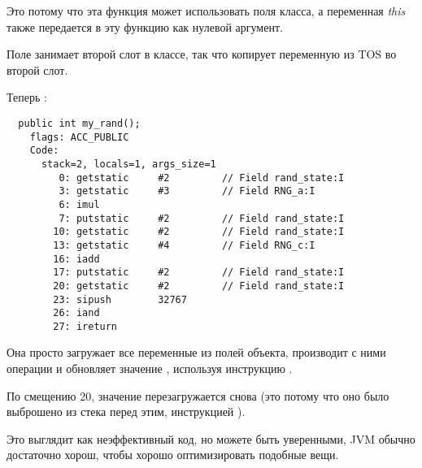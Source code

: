 Это потому что эта функция может использовать поля класса, а переменная \emph{this} 
также передается в эту функцию как нулевой аргумент.

Поле  занимает второй слот в классе,
так что  копирует переменную из \ac{TOS} во второй слот.

Теперь :

\begin{lstlisting}
  public int my_rand();
    flags: ACC_PUBLIC
    Code:
      stack=2, locals=1, args_size=1
         0: getstatic     #2         // Field rand_state:I
         3: getstatic     #3         // Field RNG_a:I
         6: imul          
         7: putstatic     #2         // Field rand_state:I
        10: getstatic     #2         // Field rand_state:I
        13: getstatic     #4         // Field RNG_c:I
        16: iadd          
        17: putstatic     #2         // Field rand_state:I
        20: getstatic     #2         // Field rand_state:I
        23: sipush        32767
        26: iand          
        27: ireturn       
\end{lstlisting}


Она просто загружает все переменные из полей объекта, производит с ними операции
и обновляет значение , используя инструкцию .

По смещению 20, значение  перезагружается снова
(это потому что оно было выброшено из стека перед этим, инструкцией ).

Это выглядит как неэффективный код, но можете быть уверенными, \ac{JVM} обычно достаточно
хорош, чтобы хорошо оптимизировать подобные вещи.
